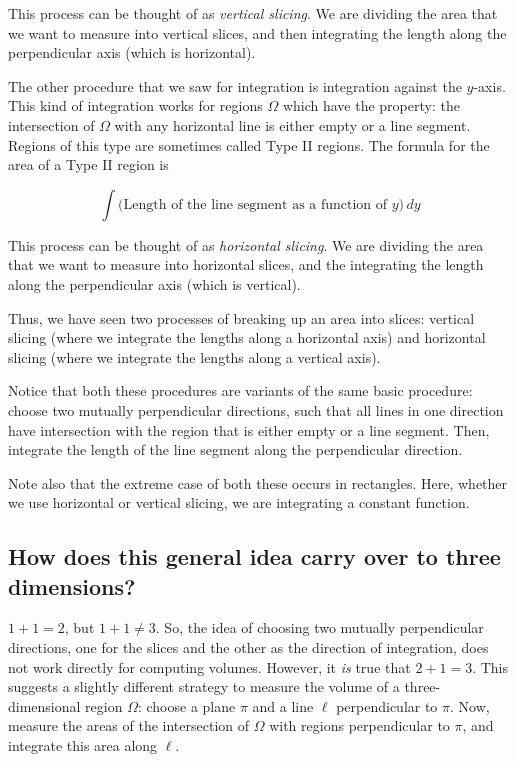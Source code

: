 \documentclass[10pt]{amsart}
\begin{document}
This process can be thought of as {\em vertical slicing}. We are
dividing the area that we want to measure into vertical slices, and
then integrating the length along the perpendicular axis (which is
horizontal).

The other procedure that we saw for integration is integration against
the $y$-axis. This kind of integration works for regions $\Omega$
which have the property: the intersection of $\Omega$ with any
horizontal line is either empty or a line segment. Regions of this
type are sometimes called Type II regions. The formula for the area of
a Type II region is

$$ \int \text{(Length of the line segment as a function of $y$)} \, dy$$

This process can be thought of as {\em horizontal slicing}. We are
dividing the area that we want to measure into horizontal slices, and
the integrating the length along the perpendicular axis (which is
vertical).

Thus, we have seen two processes of breaking up an area into slices:
vertical slicing (where we integrate the lengths along a horizontal
axis) and horizontal slicing (where we integrate the lengths along a
vertical axis).

Notice that both these procedures are variants of the same basic
procedure: choose two mutually perpendicular directions, such that all
lines in one direction have intersection with the region that is
either empty or a line segment. Then, integrate the length of the line
segment along the perpendicular direction.

Note also that the extreme case of both these occurs in
rectangles. Here, whether we use horizontal or vertical slicing, we
are integrating a constant function.

\subsection{How does this general idea carry over to three dimensions?}

$1 + 1 = 2$, but $1 + 1 \ne 3$. So, the idea of choosing two mutually
perpendicular directions, one for the slices and the other as the
direction of integration, does not work directly for computing
volumes. However, it {\em is} true that $2 + 1 = 3$. This suggests a
slightly different strategy to measure the volume of a
three-dimensional region $\Omega$: choose a plane $\pi$ and a line
$\ell$ perpendicular to $\pi$. Now, measure the areas of the
intersection of $\Omega$ with regions perpendicular to $\pi$, and
integrate this area along $\ell$.
\end{document}
